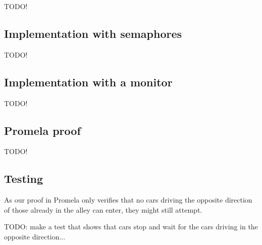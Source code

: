 
TODO!


\subsection{Implementation with semaphores}
\label{sub:all-sema}
TODO!

\subsection{Implementation with a monitor}
\label{sub:all-moni}
TODO!

\subsection{Promela proof}
\label{sub:all-proof}
TODO!

\subsection{Testing}
\label{sub:all-test}
As our proof in Promela only verifies that no cars driving the opposite direction of those already in the alley can enter, they might still attempt.

TODO: make a test that shows that cars stop and wait for the cars driving in the opposite direction...